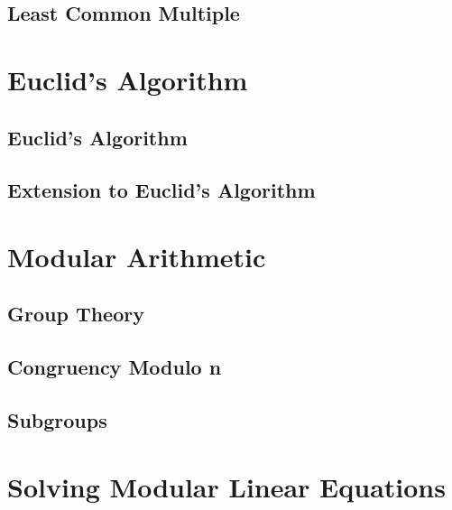 \documentclass{beamer}
\begin{document}
\subsection{Least Common Multiple}

\section{Euclid's Algorithm}

\subsection{Euclid's Algorithm}

\subsection{Extension to Euclid's Algorithm}

\section{Modular Arithmetic}

\subsection{Group Theory}

\subsection{Congruency Modulo n}



\subsection{Subgroups}

\section{Solving Modular Linear Equations}
\end{document}
